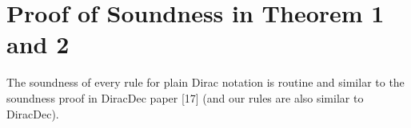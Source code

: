 \documentclass[runningheads]{llncs}
\def\>{\ensuremath{\rangle}}
\def\<{\ensuremath{\langle}}
\begin{document}
\newcommand{\var}{\mathsf{var}}
\newcommand{\reg}{\mathsf{Reg}}
\newcommand{\DType}{\mathcal{D}}
\newcommand{\cR}{\mathcal{R}}
\newcommand{\cN}{\mathcal{N}}
\newcommand{\tD}{\tilde{D}}
\newcommand{\te}{\tilde{e}}
\newcommand{\tT}{\tilde{T}}
\newcommand{\tADD}{\widetilde{ADD}}
\newcommand{\bU}{\mathbf{U}}
\renewcommand{\<}{\langle}
\newcommand{\simp}{\mathsf{Simp}}
\newcommand{\List}{\mathsf{list}}
\renewcommand{\>}{\rangle}
\newcommand {\cD } {{\mathcal{D}}}
\newcommand {\cl } {{\mathit{cl}}}




% 

% 

% 

% 

% 

% 




    

%
%
%

\section{Proof of Soundness in Theorem 1 and 2}
The soundness of every rule for plain Dirac notation is routine and similar to the soundness proof in DiracDec paper [17] (and our rules are also similar to DiracDec).
\end{document}
